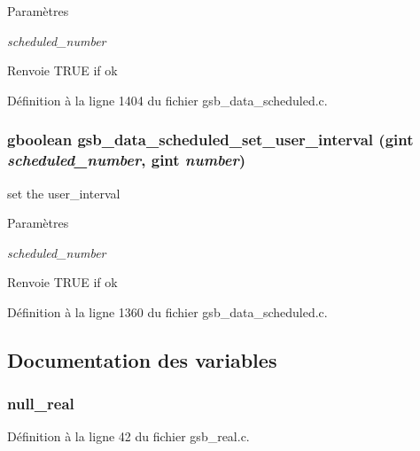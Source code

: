 \begin{DoxyParams}{Paramètres}
\item[{\em scheduled\_\-number}]\item[{\em }]\end{DoxyParams}
\begin{DoxyReturn}{Renvoie}
TRUE if ok 
\end{DoxyReturn}


Définition à la ligne 1404 du fichier gsb\_\-data\_\-scheduled.c.

\subsubsection[{gsb\_\-data\_\-scheduled\_\-set\_\-user\_\-interval}]{\setlength{\rightskip}{0pt plus 5cm}gboolean gsb\_\-data\_\-scheduled\_\-set\_\-user\_\-interval (gint {\em scheduled\_\-number}, \/  gint {\em number})}\label{gsb__data__scheduled_8c_aa4ef2d6501ecf7274a83c5d1d5d0ad03}
set the user\_\-interval


\begin{DoxyParams}{Paramètres}
\item[{\em scheduled\_\-number}]\item[{\em }]\end{DoxyParams}
\begin{DoxyReturn}{Renvoie}
TRUE if ok 
\end{DoxyReturn}


Définition à la ligne 1360 du fichier gsb\_\-data\_\-scheduled.c.



\subsection{Documentation des variables}
\subsubsection[{null\_\-real}]{ {\bf null\_\-real}}\label{gsb__data__scheduled_8c_a26f304bec3fdc0651b9aa8765d4de3c6}


Définition à la ligne 42 du fichier gsb\_\-real.c.

